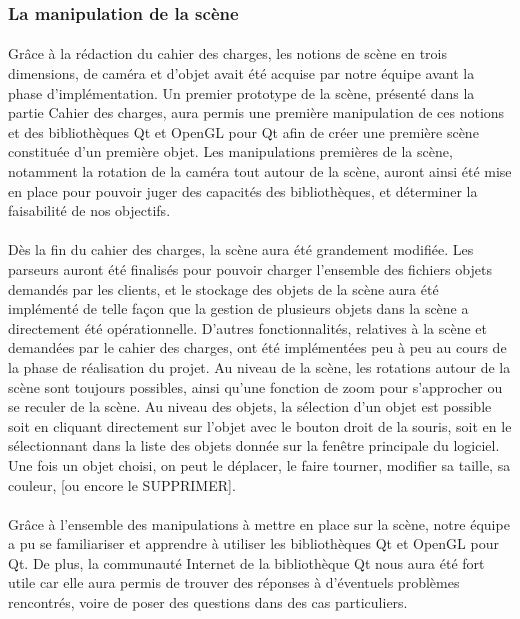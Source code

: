 \subsubsection{La manipulation de la scène}
\paragraph{}
Grâce à la rédaction du cahier des charges, les notions de scène en trois dimensions, de caméra et d'objet avait été acquise par notre équipe avant la phase d'implémentation. Un premier prototype de la scène, présenté dans la partie Cahier des charges, aura permis une première manipulation de ces notions et des bibliothèques Qt et OpenGL pour Qt afin de créer une première scène constituée d'un première objet. Les manipulations premières de la scène, notamment la rotation de la caméra tout autour de la scène, auront ainsi été mise en place pour pouvoir juger des capacités des bibliothèques, et déterminer la faisabilité de nos objectifs.

\paragraph{}
Dès la fin du cahier des charges, la scène aura été grandement modifiée. Les parseurs auront été finalisés pour pouvoir charger l'ensemble des fichiers objets demandés par les clients, et le stockage des objets de la scène aura été implémenté de telle façon que la gestion de plusieurs objets dans la scène a directement été opérationnelle. D'autres fonctionnalités, relatives à la scène et demandées par le cahier des charges, ont été implémentées peu à peu au cours de la phase de réalisation du projet. Au niveau de la scène, les rotations autour de la scène sont toujours possibles, ainsi qu'une fonction de zoom pour s'approcher ou se reculer de la scène. Au niveau des objets, la sélection d'un objet est possible soit en cliquant directement sur l'objet avec le bouton droit de la souris, soit en le sélectionnant dans la liste des objets donnée sur la fenêtre principale du logiciel. Une fois un objet choisi, on peut le déplacer, le faire tourner, modifier sa taille, sa couleur, [ou encore le SUPPRIMER].

\paragraph{}
Grâce à l'ensemble des manipulations à mettre en place sur la scène, notre équipe a pu se familiariser et apprendre à utiliser les bibliothèques Qt et OpenGL pour Qt. De plus, la communauté Internet de la bibliothèque Qt nous aura été fort utile car elle aura permis de trouver des réponses à d'éventuels problèmes rencontrés, voire de poser des questions dans des cas particuliers.

